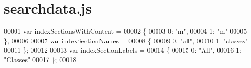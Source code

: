 \hypertarget{searchdata_8js_source}{}\section{searchdata.\+js}
\label{searchdata_8js_source}

\begin{DoxyCode}
00001 var indexSectionsWithContent =
00002 \{
00003   0: \textcolor{stringliteral}{"m"},
00004   1: \textcolor{stringliteral}{"m"}
00005 \};
00006 
00007 var indexSectionNames =
00008 \{
00009   0: \textcolor{stringliteral}{"all"},
00010   1: \textcolor{stringliteral}{"classes"}
00011 \};
00012 
00013 var indexSectionLabels =
00014 \{
00015   0: \textcolor{stringliteral}{"All"},
00016   1: \textcolor{stringliteral}{"Classes"}
00017 \};
00018 
\end{DoxyCode}
